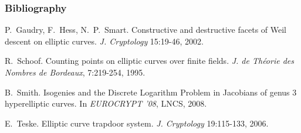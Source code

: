 \documentclass[10pt]{beamer}
\newcommand{\0}{\mathcal{O}}  %
\begin{document}
\begin{frame}
  \frametitle{Bibliography}

  \begin{thebibliography}{1}

    P.~Gaudry, F.~Hess, N.~P.~Smart.
    \newblock Constructive and destructive facets of Weil
    descent on elliptic curves.
    \newblock \emph{J. Cryptology} 15:19-46, 2002.

   R.~Schoof. \newblock Counting points on
    elliptic curves over finite fields. \newblock \emph{J. de Théorie
      des Nombres de Bordeaux}, 7:219-254, 1995.

   B.~Smith.  \newblock Isogenies and the
    Discrete Logarithm Problem in Jacobians of genus $3$ hyperelliptic
    curves.
    \newblock In \emph{EUROCRYPT '08}, LNCS, 2008.

   E.~Teske. \newblock Elliptic curve
    trapdoor system. \newblock \emph{J. Cryptology} 19:115-133, 2006.

  \end{thebibliography}
\end{frame}
\end{document}
